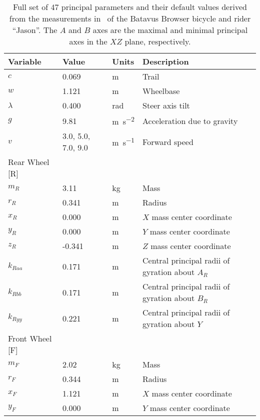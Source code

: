 \documentclass{bmd2019p}
\begin{document}
\begin{table}
  \caption{Full set of 47 principal parameters and their default values derived
    from the measurements in~\cite{Moore2012} of the Batavus Browser bicycle
    and rider ``Jason''. The $A$ and $B$ axes are the maximal and minimal
    principal axes in the $XZ$ plane, respectively.}
  \label{tab:parameters}
  \small
  \centering
  \begin{tabular}{llll}
    \toprule
    Variable & Value & Units & Description \\
    \midrule
    $c$       &  0.069           & \si{\meter} & Trail \\
    $w$       &  1.121             & \si{\meter} & Wheelbase \\
    $\lambda$ & 0.400             & \si{\radian} & Steer axis tilt \\
    $g$       &  9.81               & \si{\meter\per\second\squared} & Acceleration due to gravity \\
    $v$       &  3.0, 5.0, 7.0, 9.0 & \si{\meter\per\second} & Forward speed \\
    Rear Wheel [R] & & \\
    \midrule
    $m_R$     & 3.11 & \si{\kilogram}  & Mass \\
    $r_R$     & 0.341 & \si{\meter}  & Radius \\
    $x_R$     & 0.000 & \si{\meter}      & $X$ mass center coordinate \\
    $y_R$     & 0.000 & \si{\meter}      & $Y$ mass center coordinate \\
    $z_R$     & -0.341 & \si{\meter} & $Z$ mass center coordinate \\
    $k_{Raa}$ & 0.171 & \si{\meter}  & Central principal radii of gyration about $A_R$ \\
    $k_{Rbb}$ & 0.171 & \si{\meter}  & Central principal radii of gyration about $B_R$ \\
    $k_{Ryy}$ & 0.221 & \si{\meter}  & Central principal radii of gyration about $Y$ \\
    Front Wheel [F] & & \\
    \midrule
    $m_F$     & 2.02 & \si{\kilogram} & Mass \\
    $r_F$     & 0.344 & \si{\meter} & Radius \\
    $x_F$     & 1.121 & \si{\meter} & $X$ mass center coordinate \\
    $y_F$     & 0.000 & \si{\meter} & $Y$ mass center coordinate \\

\end{tabular}
\end{table}
\end{document}
